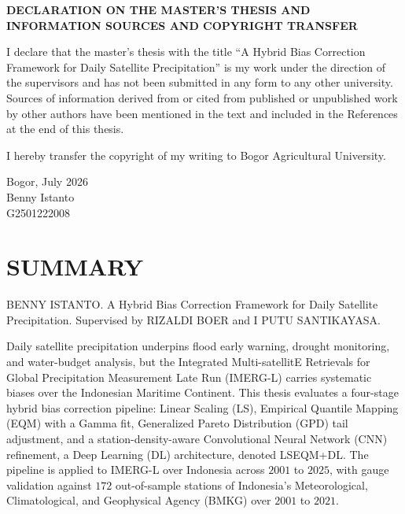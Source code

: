 \thispagestyle{empty}
\begin{center}
  {\fontsize{14}{17}\selectfont\bfseries
   DECLARATION ON THE MASTER'S THESIS AND\\
   INFORMATION SOURCES AND COPYRIGHT TRANSFER\par}
\end{center}
\vspace{\baselineskip}

I declare that the master's thesis with the title ``A Hybrid Bias
Correction Framework for Daily Satellite Precipitation'' is my work under the
direction of the supervisors and has not been submitted in any form to
any other university. Sources of information derived from or cited from
published or unpublished work by other authors have been mentioned in
the text and included in the References at the end of this thesis.

I hereby transfer the copyright of my writing to Bogor Agricultural
University.

\vspace{\baselineskip}
\begin{flushright}
Bogor, July 2026\\[\baselineskip]
Benny Istanto\\
G2501222008
\end{flushright}
\clearpage

\thispagestyle{empty}\null\clearpage

\chapter*{SUMMARY}\thispagestyle{empty}
\noindent BENNY ISTANTO. A Hybrid Bias Correction Framework for
Daily Satellite Precipitation. Supervised by RIZALDI BOER and I PUTU
SANTIKAYASA.

\medskip
Daily satellite precipitation underpins flood early warning, drought
monitoring, and water-budget analysis, but the Integrated Multi-satellitE
Retrievals for Global Precipitation Measurement Late Run (IMERG-L)
carries systematic biases over the Indonesian Maritime Continent. 
This thesis evaluates a four-stage hybrid bias correction pipeline: 
Linear Scaling (LS), Empirical Quantile Mapping (EQM) with a Gamma fit, 
Generalized Pareto Distribution (GPD) tail adjustment, and a station-density-aware 
Convolutional Neural Network (CNN) refinement, a Deep Learning (DL) architecture,
denoted LSEQM+DL. The pipeline is applied to IMERG-L over Indonesia across $2001$ to $2025$, with
gauge validation against $172$ out-of-sample stations of Indonesia's
Meteorological, Climatological, and Geophysical Agency (BMKG) over $2001$ to $2021$.

